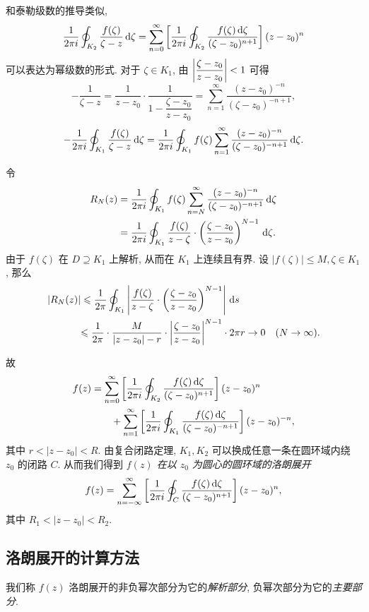 \documentclass[nocolor,theme=doremi,lang=cn,11pt,chinese,twoside,openright,usesamecnt]{elegantbook}
\begin{document}
和泰勒级数的推导类似,
	\[\frac1{2\pi i}\oint_{K_2}\frac{f(\zeta)}{\zeta-z}\,\mathrm{d}\zeta
	=\sum_{n=0}^\infty\left[\frac1{2\pi i}\oint_{K_2}\frac{f(\zeta)\,\mathrm{d}\zeta}{(\zeta-z_0)^{n+1}}\right](z-z_0)^n\]
可以表达为幂级数的形式.
对于 $\zeta\in K_1$, 由 $\left|\dfrac{\zeta-z_0}{z-z_0}\right|<1$ 可得
	\[-\frac1{\zeta-z}=\frac1{z-z_0}\cdot\frac1{1-\dfrac{\zeta-z_0}{z-z_0}}=\sum_{n=1}^\infty\frac{(z-z_0)^{-n}}{(\zeta-z_0)^{-n+1}},\]
	\[-\frac1{2\pi i}\oint_{K_1}\frac{f(\zeta)}{\zeta-z}\,\mathrm{d}\zeta=\frac1{2\pi i}\oint_{K_1}f(\zeta)\sum_{n=1}^\infty\frac{(z-z_0)^{-n}}{(\zeta-z_0)^{-n+1}}\,\mathrm{d}\zeta.\]

令
\begin{align*}
	R_N(z)&=\frac1{2\pi i}\oint_{K_1}f(\zeta)\sum_{n=N}^\infty\frac{(z-z_0)^{-n}}{(\zeta-z_0)^{-n+1}}\,\mathrm{d}\zeta\\
	&=\frac1{2\pi i}\oint_{K_1}\frac{f(\zeta)}{z-\zeta}\cdot\left(\frac{\zeta-z_0}{z-z_0}\right)^{N-1}\,\mathrm{d}\zeta.
\end{align*}
由于 $f(\zeta)$ 在 $D\supseteq K_1$ 上解析, 从而在 $K_1$ 上连续且有界.
设 $|f(\zeta)|\le M,\zeta\in K_1$,
那么
\begin{align*}
|R_N(z)|&\leqslant\frac 1{2\pi}\oint_{K_1}\left|\frac{f(\zeta)}{z-\zeta}\cdot\left(\frac{\zeta-z_0}{z-z_0}\right)^{N-1}\right|\,\mathrm{d} s\\
&{\leqslant\frac 1{2\pi}\cdot\frac M{|z-z_0|-r}\cdot\left|\frac{\zeta-z_0}{z-z_0}\right|^{N-1}\cdot 2\pi r\to 0\quad (N\to\infty).}
\end{align*}

故
\begin{align*}
f(z)&=\sum_{n=0}^\infty\left[\frac1{2\pi i}\oint_{K_2}\frac{f(\zeta)\,\mathrm{d}\zeta}{(\zeta-z_0)^{n+1}}\right](z-z_0)^n\\
&\qquad+\sum_{n=1}^\infty \left[\frac1{2\pi i}\oint_{K_1}\frac{f(\zeta)\,\mathrm{d}\zeta}{(\zeta-z_0)^{-n+1}}\right](z-z_0)^{-n},
\end{align*}
其中 $r<|z-z_0|<R$.
由复合闭路定理, $K_1,K_2$ 可以换成任意一条在圆环域内绕 $z_0$ 的闭路 $C$.
从而我们得到 \emph{$f(z)$ 在以 $z_0$ 为圆心的圆环域的洛朗展开}
	\[f(z)=\sum_{n=-\infty}^\infty\left[\frac1{2\pi i}\oint_C\frac{f(\zeta)\,\mathrm{d}\zeta}{(\zeta-z_0)^{n+1}}\right](z-z_0)^n,\]
其中 $R_1<|z-z_0|<R_2$.

\subsection{洛朗展开的计算方法}

我们称 $f(z)$ 洛朗展开的非负幂次部分为它的\emph{解析部分}, 负幂次部分为它的\emph{主要部分}.
\end{document}

